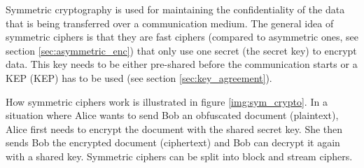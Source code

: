 Symmetric cryptography is used for maintaining the confidentiality of the data that is being transferred over a communication medium. The general idea of symmetric ciphers is that they are fast ciphers (compared to asymmetric ones, see section \ref{sec:asymmetric_enc}) that only use one secret (the secret key) to encrypt data. This key needs to be either pre-shared before the communication starts or a KEP ({\acl{KEP}}) has to be used (see section \ref{sec:key_agreement}). \cite{Ristic2014}

How symmetric ciphers work is illustrated in figure \ref{img:sym_crypto}. In a situation where Alice wants to send Bob an obfuscated document (plaintext), Alice first needs to encrypt the document with the shared secret key. She then sends Bob the encrypted document (ciphertext) and Bob can decrypt it again with a shared key. Symmetric ciphers can be split into block and stream ciphers.

